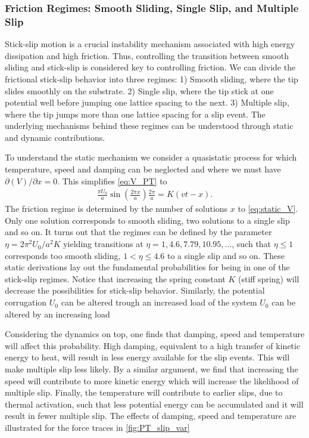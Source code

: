 \subsubsection{Friction Regimes: Smooth Sliding, Single Slip, and Multiple Slip}
Stick-slip motion is a crucial instability mechanism associated with high energy dissipation and high friction. Thus, controlling the transition between smooth sliding and stick-slip is considered key to controlling friction. We can divide the frictional stick-slip behavior into three regimes: 1) Smooth sliding, where the tip slides smoothly on the substrate. 2) Single slip, where the tip stick at one potential well before jumping one lattice spacing to the next. 3) Multiple slip, where the tip jumps more than one lattice spacing for a slip event. The underlying mechanisms behind these regimes can be understood through static and dynamic contributions. 

To understand the static mechanism we consider a quasistatic process for which temperature, speed and damping can be neglected and where we must have $\partial(V)/\partial x = 0$. This simplifies \cref{eq:V_PT} to 
\begin{align}
  \frac{\pi U_0}{a} \sin\left(\frac{2\pi x}{a}\right) \frac{2 \pi}{a} = K(vt - x).
  \label{eq:static_V}
\end{align}
The friction regime is determined by the number of solutions $x$ to \cref{eq:static_V}. Only one solution corresponds to
smooth sliding, two solutions to a single slip and so on. It turns out that the
regimes can be defined by the parameter $\eta = 2\pi^2U_0/a^2K$ \cite{Johnson_1998, Medyanik_2006} yielding transitions at $\eta = 1, 4.6, 7.79, 10.95, \hdots$, such that $\eta \le 1$
corresponds too smooth sliding, $1<\eta \le 4.6$ to a single slip and so on. These static derivations lay out the fundamental probabilities for being in one of the stick-slip regimes. Notice that increasing the spring constant $K$ (stiff spring) will decrease the possibilities for stick-slip behavior. Similarly, the potential corrugation $U_0$ can be altered trough an increased load of the system
$U_0$ can be altered by an increasing load \cite{Vanossi_2013}


Considering the dynamics on top, one finds that damping, speed and temperature will affect this probability. High damping, equivalent to a high transfer
of kinetic energy to heat, will result in less energy available for the slip events. This will make multiple slip less likely. By a similar argument, we find that increasing the speed will contribute to more kinetic energy which will increase the likelihood of multiple slip. Finally, the temperature will contribute to earlier slips, due to thermal activation, such that
less potential energy can be accumulated and it will result in fewer multiple slip. The effects of damping, speed and temperature are illustrated for the force traces in \cref{fig:PT_slip_var}





